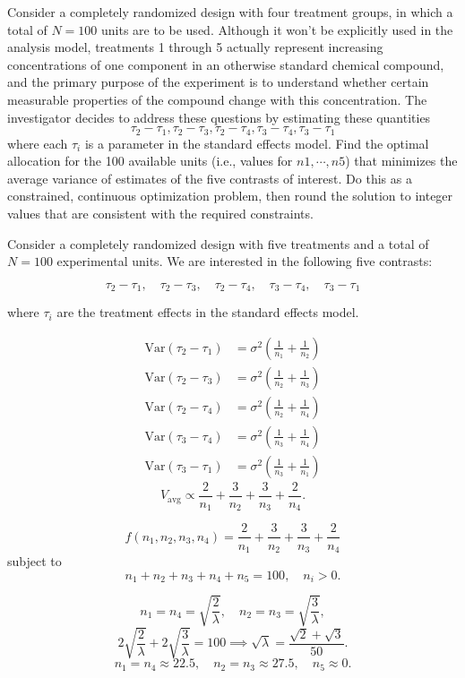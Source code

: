\documentclass{article}
\begin{document}
Consider a completely randomized design with four treatment groups, in which a total of $N = 100$
units are to be used. Although it won’t be explicitly used in the analysis model, treatments 1 through
5 actually represent increasing concentrations of one component in an otherwise standard chemical
compound, and the primary purpose of the experiment is to understand whether certain measurable
properties of the compound change with this concentration. The investigator decides to address these
questions by estimating these quantities
$$
	\tau_2 -\tau_1, \tau_2-\tau_3, \tau_2-\tau_4,\tau_3 - \tau_4, \tau_3-\tau_1
$$
where each $\tau_i$ is a parameter in the standard effects model. Find the optimal allocation for the 100
available units (i.e., values for $n1,\cdots, n5$) that minimizes the average variance of estimates of the five
contrasts of interest. Do this as a constrained, continuous optimization problem, then round the solution
to integer values that are consistent with the required constraints.

Consider a completely randomized design with five treatments and a total of $N = 100$ experimental units. We are interested in the following five contrasts:

\[
	\tau_2 -\tau_1, \quad \tau_2-\tau_3, \quad \tau_2-\tau_4, \quad \tau_3 - \tau_4, \quad \tau_3-\tau_1
\]

where $\tau_i$ are the treatment effects in the standard effects model.


\[
	\begin{aligned}
		\mathrm{Var}(\tau_2-\tau_1) & = \sigma^2 \left( \frac{1}{n_1} + \frac{1}{n_2} \right) \\
		\mathrm{Var}(\tau_2-\tau_3) & = \sigma^2 \left( \frac{1}{n_2} + \frac{1}{n_3} \right) \\
		\mathrm{Var}(\tau_2-\tau_4) & = \sigma^2 \left( \frac{1}{n_2} + \frac{1}{n_4} \right) \\
		\mathrm{Var}(\tau_3-\tau_4) & = \sigma^2 \left( \frac{1}{n_3} + \frac{1}{n_4} \right) \\
		\mathrm{Var}(\tau_3-\tau_1) & = \sigma^2 \left( \frac{1}{n_3} + \frac{1}{n_1} \right)
	\end{aligned}
\]
\[
	V_{\text{avg}} \propto \frac{2}{n_1} + \frac{3}{n_2} + \frac{3}{n_3} + \frac{2}{n_4}.
\]

\[
	f(n_1,n_2,n_3,n_4) = \frac{2}{n_1} + \frac{3}{n_2} + \frac{3}{n_3} + \frac{2}{n_4}
\]
subject to
\[
	n_1 + n_2 + n_3 + n_4 + n_5 = 100, \quad n_i > 0.
\]

\[
	n_1 = n_4 = \sqrt{\frac{2}{\lambda}}, \quad n_2 = n_3 = \sqrt{\frac{3}{\lambda}},
\]
\[
	2\sqrt{\frac{2}{\lambda}} + 2\sqrt{\frac{3}{\lambda}} = 100 \implies \sqrt{\lambda} = \frac{\sqrt{2}+\sqrt{3}}{50}.
\]
\[
	n_1 = n_4 \approx 22.5, \quad n_2 = n_3 \approx 27.5, \quad n_5 \approx 0.
\]
\end{document}

